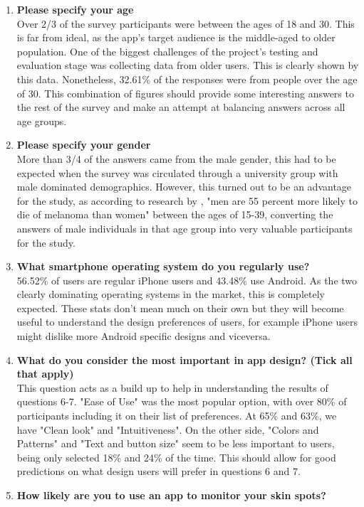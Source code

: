 \begin{enumerate}
    \item \textbf{Please specify your age}
    \\ Over 2/3 of the survey participants were between the ages of 18 and 30. This is far from ideal, as the app's target audience is the middle-aged to older population. One of the biggest challenges of the project's testing and evaluation stage was collecting data from older users. This is clearly shown by this data. Nonetheless, 32.61\% of the responses were from people over the age of 30. This combination of figures should provide some interesting answers to the rest of the survey and make an attempt at balancing answers across all age groups. 
    \item \textbf{Please specify your gender}
    \\ More than 3/4 of the answers came from the male gender, this had to be expected when the survey was circulated through a university group with male dominated demographics. However, this turned out to be an advantage for the study, as according to research by \cite{fisher2013disproportionate}, "men are 55 percent more likely to die of melanoma than women" between the ages of 15-39, converting the answers of male individuals in that age group into very valuable participants for the study.
    \item \textbf{What smartphone operating system do you regularly use?}
    \\ 56.52\% of users are regular iPhone users and 43.48\% use Android. As the two clearly dominating operating systems in the market, this is completely expected. These stats don't mean much on their own but they will become useful to understand the design preferences of users, for example iPhone users might dislike more Android specific designs and viceversa.
    \item \textbf{What do you consider the most important in app design? (Tick all that apply)}
    \\ This question acts as a build up to help in understanding the results of questions 6-7. "Ease of Use" was the most popular option, with over 80\% of participants including it on their list of preferences. At 65\% and 63\%, we have "Clean look" and "Intuitiveness". On the other side, "Colors and Patterns" and "Text and button size" seem to be less important to users, being only selected 18\% and 24\% of the time. This should allow for good predictions on what design users will prefer in questions 6 and 7.
    \item \textbf{How likely are you to use an app to monitor your skin spots?}

\end{enumerate}
